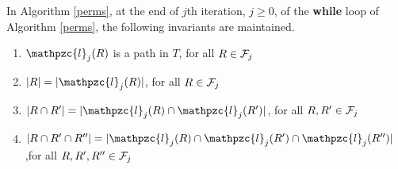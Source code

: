 \documentclass[11pt,letter]{../lib/llncs}
\def\cF{{\cal F}}
\def\cl{\mathpzc{l}}
\def\topshrink{0mm} %
\begin{document}
\begin{lemma}
  \label{lem:invar1} In Algorithm \ref{perms}, at the end of $j$th
  iteration, $j \ge 0$, of the {\bf while} loop of Algorithm
  \ref{perms}, the following invariants are maintained.
 \begin{enumerate}[I {\textreferencemark}] \vspace{\topshrink}
  \item $\cl_j(R)$ is a path in $T$,\hfill 
    for all $R \in \cF_j$\vspace{\topshrink}
  \item $|R| = |\cl_j(R)|$,\hfill 
    for all $R \in \cF_j$\vspace{\topshrink}
  \item $|R \cap R'| = |\cl_j(R) \cap \cl_j(R')|$,\hfill 
    for all $R, R' \in \cF_j$\vspace{\topshrink}
  \item $|R \cap R' \cap R''|=|\cl_j(R) \cap \cl_j(R') \cap
    \cl_j(R'')|$,\hfill for all $R, R', R'' \in \cF_j$
  \end{enumerate}
\end{lemma}
\end{document}
